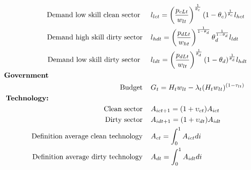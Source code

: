 \begin{align*}
%
\text{Demand low skill clean sector } \hspace{4mm}&l_{lct}= \left(\frac{p_{cLt}}{w_{lt}}\right)^{\frac{1}{\theta_c}}(1-\theta_c)^{\frac{1}{\theta_c}}l_{hct}\\
%
\text{Demand high skill dirty sector} \hspace{4mm}&l_{hdt}= \left(\frac{p_{dLt}}{w_{ht}}\right)^{\frac{1}{1-\theta_d}}\theta_d^{\frac{1}{1-\theta_d}}l_{ldt}\\
%
\text{Demand low skill dirty sector } \hspace{4mm}&l_{ldt}= \left(\frac{p_{dLt}}{w_{lt}}\right)^{\frac{1}{\theta_d}}(1-\theta_d)^{\frac{1}{\theta_d}}l_{hdt}\\
\text{\textbf{Government}}\hspace{50mm}& \nonumber\\
\text{Budget}\hspace{4mm}& G_t=H_tw_{lt}-\lambda_t(H_t w_{lt})^{(1-\tau_{lt})}
\\
\text{\textbf{Technology:}}\hspace{50mm}&\\
\text{Clean sector}\hspace{4mm}& A_{ict+1}=(1+\upsilon_{ct})A_{ict}\\
\text{Dirty sector}\hspace{4mm}& A_{idt+1}=(1+\upsilon_{dt})A_{idt}\\
\text{Definition average clean technology}\hspace{4mm}& A_{ct}=\int_0^1A_{ict}di\\
\text{Definition average dirty technology}\hspace{4mm}& A_{dt}=\int_0^1A_{idt}di
\end{align*}

